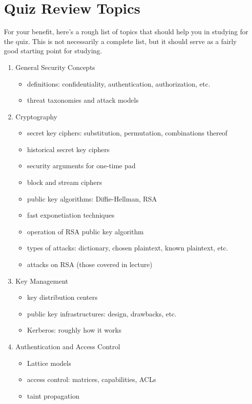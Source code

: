 \documentclass[11pt]{article}
\begin{document}
\newpage
\section*{Quiz Review Topics}

For your benefit, here's a rough list of topics that should help you in
studying for the quiz.  This is not necessarily a complete list, but it
should serve as a fairly good starting point for studying.

\begin{enumerate}
%
\item General Security Concepts
\begin{itemize}
\item definitions: confidentiality, authentication, authorization, etc.
\item threat taxonomies and attack models
\end{itemize}
%
\item Cryptography
\begin{itemize}
\item secret key ciphers: substitution, permutation, combinations
  thereof
\item historical secret key ciphers
\item security arguments for one-time pad
\item block and stream ciphers
\item public key algorithms: Diffie-Hellman, RSA
\item fast exponetiation techniques
\item operation of RSA public key algorithm
\item types of attacks: dictionary, chosen plaintext, known plaintext, etc.
\item attacks on RSA (those covered in lecture)
\end{itemize}
%
\item Key Management
\begin{itemize}
\item key distribution centers
\item public key infrastructures: design, drawbacks, etc.
\item Kerberos: roughly how it works
\end{itemize}
\item Authentication and Access Control
\begin{itemize}
\item Lattice models
\item access control: matrices, capabilities, ACLs
\item taint propagation

\end{itemize}
\end{enumerate}
\end{document}
